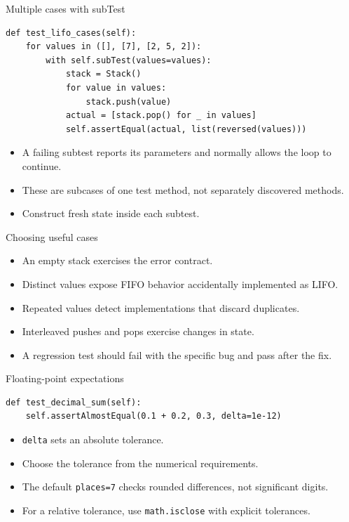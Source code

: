 \documentclass[aspectratio=169,11pt]{beamer}
\newcommand{\code}[1]{\texttt{#1}}
\begin{document}
\begin{frame}[fragile]{Multiple cases with subTest}
\begin{lstlisting}
def test_lifo_cases(self):
    for values in ([], [7], [2, 5, 2]):
        with self.subTest(values=values):
            stack = Stack()
            for value in values:
                stack.push(value)
            actual = [stack.pop() for _ in values]
            self.assertEqual(actual, list(reversed(values)))
\end{lstlisting}
\begin{itemize}
\item A failing subtest reports its parameters and normally allows the loop to continue.
\item These are subcases of one test method, not separately discovered methods.
\item Construct fresh state inside each subtest.
\end{itemize}
\end{frame}

\begin{frame}[fragile]{Choosing useful cases}
\begin{itemize}
\item An empty stack exercises the error contract.
\item Distinct values expose FIFO behavior accidentally implemented as LIFO.
\item Repeated values detect implementations that discard duplicates.
\item Interleaved pushes and pops exercise changes in state.
\item A regression test should fail with the specific bug and pass after the fix.
\end{itemize}
\end{frame}

\begin{frame}[fragile]{Floating-point expectations}
\begin{lstlisting}
def test_decimal_sum(self):
    self.assertAlmostEqual(0.1 + 0.2, 0.3, delta=1e-12)
\end{lstlisting}
\begin{itemize}
\item \code{delta} sets an absolute tolerance.
\item Choose the tolerance from the numerical requirements.
\item The default \code{places=7} checks rounded differences, not significant digits.
\item For a relative tolerance, use \code{math.isclose} with explicit tolerances.
\end{itemize}
\end{frame}
\end{document}
